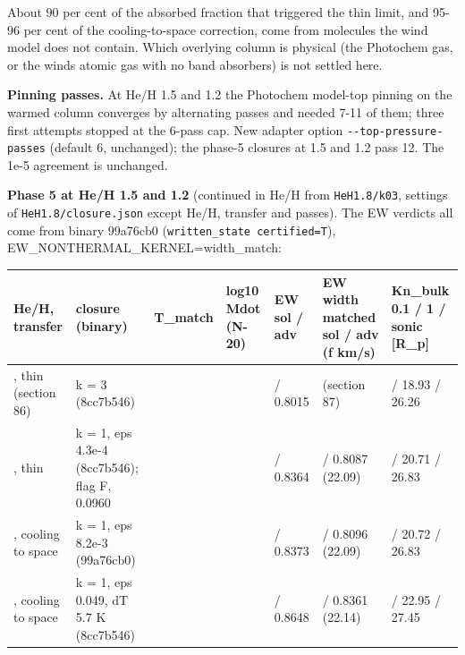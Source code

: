 \documentclass[english,a4paper]{my_memo}
\begin{document}
About 90 per cent of the absorbed fraction that triggered the thin limit,
and 95-96 per cent of the cooling-to-space correction, come from molecules
the wind model does not contain. Which overlying column is physical (the
Photochem gas, or the wind\textquotesingle s atomic gas with no band absorbers) is not
settled here.

\textbf{Pinning passes.} At He/H 1.5 and 1.2 the Photochem model-top pinning on
the warmed column converges by alternating passes and needed 7-11 of them;
three first attempts stopped at the 6-pass cap. New adapter option
\texttt{-\/-top-pressure-passes} (default 6, unchanged); the phase-5 closures at
1.5 and 1.2 pass 12. The 1e-5 agreement is unchanged.

\textbf{Phase 5 at He/H 1.5 and 1.2} (continued in He/H from \texttt{HeH1.8/k03},
settings of \texttt{HeH1.8/closure.json} except He/H, transfer and passes). The
EW verdicts all come from binary 99a76cb0 (\texttt{written\_state\ certified=T}),
EW\_NONTHERMAL\_KERNEL=width\_match:

{\def\LTcaptype{none} %
{\small
\begin{longtable}[]{@{}>{\raggedright\arraybackslash}p{\dimexpr(\linewidth-14\tabcolsep)/7\relax}>{\raggedright\arraybackslash}p{\dimexpr(\linewidth-14\tabcolsep)/7\relax}>{\raggedright\arraybackslash}p{\dimexpr(\linewidth-14\tabcolsep)/7\relax}>{\raggedright\arraybackslash}p{\dimexpr(\linewidth-14\tabcolsep)/7\relax}>{\raggedright\arraybackslash}p{\dimexpr(\linewidth-14\tabcolsep)/7\relax}>{\raggedright\arraybackslash}p{\dimexpr(\linewidth-14\tabcolsep)/7\relax}>{\raggedright\arraybackslash}p{\dimexpr(\linewidth-14\tabcolsep)/7\relax}@{}}
\toprule\noalign{}
He/H, transfer & closure (binary) & T\_match & log10 Mdot (N-20) & EW sol / adv & EW width matched sol / adv (f km/s) & Kn\_bulk 0.1 / 1 / sonic {[}R\_p{]} \\
\midrule\noalign{}
\endhead
\bottomrule\noalign{}
\endlastfoot
1.8, thin (section 86) & k = 3 (8cc7b546) & 359.55 & 7.9359 & 0.7975 / 0.8015 & 0.7710 (section 87) & 6.11 / 18.93 / 26.26 \\
1.5, thin & k = 1, eps 4.3e-4 (8cc7b546); flag F, 0.0960 & 373.54 & 7.9766 & 0.8318 / 0.8364 & 0.8042 / 0.8087 (22.09) & 6.54 / 20.71 / 26.83 \\
1.5, cooling to space & k = 1, eps 8.2e-3 (99a76cb0) & 375.98 & 7.9770 & 0.8327 / 0.8373 & 0.8050 / 0.8096 (22.09) & 6.55 / 20.72 / 26.83 \\
1.2, cooling to space & k = 1, eps 0.049, dT 5.7 K (8cc7b546) & 386.37 & 8.0218 & 0.8593 / 0.8648 & 0.8308 / 0.8361 (22.14) & 7.08 / 22.95 / 27.45 \\
\end{longtable}
}
}
\end{document}
